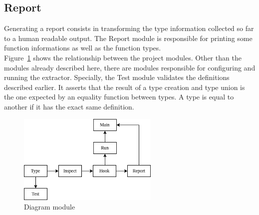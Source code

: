 \subsection*{Report}
Generating a report consists in transforming the type information collected so far to a human readable output. The Report module is responsible for printing some function informations as well as the function types.
\\

Figure~\ref{fig:diag} shows the relationship between the project modules. Other than the modules already described here, there are modules responsible for configuring and running the extractor. Specially, the Test module validates the definitions described earlier. It asserts that the result of a type creation and type union is the one expected by an equality function between types. A type is equal to another if it has the exact same definition.

\begin{figure}
\centering
\includegraphics[width=0.60\textwidth]{pictures/module_diagram.png}
\caption{Diagram module}
\label{fig:diag}
\end{figure}











